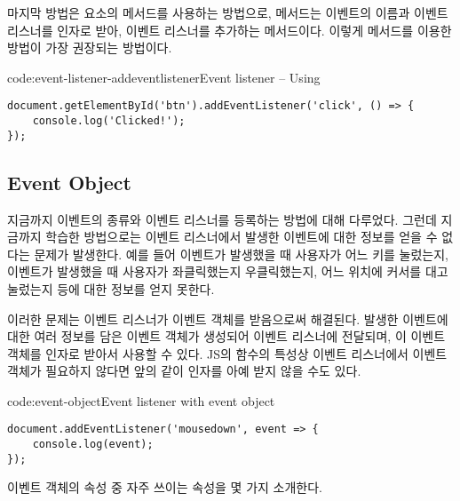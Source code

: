 마지막 방법은 요소의  메서드를 사용하는 방법으로,  메서드는 이벤트의 이름과 이벤트 리스너를 인자로 받아, 이벤트 리스너를 추가하는 메서드이다. 이렇게  메서드를 이용한 방법이 가장 권장되는 방법이다.

\begin{codeenv}{code:event-listener-addeventlistener}{Event listener – Using }\begin{verbatim}
document.getElementById('btn').addEventListener('click', () => {
    console.log('Clicked!');
});
\end{verbatim}
\end{codeenv}

\subsection*{Event Object}

지금까지 이벤트의 종류와 이벤트 리스너를 등록하는 방법에 대해 다루었다. 그런데 지금까지 학습한 방법으로는 이벤트 리스너에서 발생한 이벤트에 대한 정보를 얻을 수 없다는 문제가 발생한다. 예를 들어  이벤트가 발생했을 때 사용자가 어느 키를 눌렀는지,  이벤트가 발생했을 때 사용자가 좌클릭했는지 우클릭했는지, 어느 위치에 커서를 대고 눌렀는지 등에 대한 정보를 얻지 못한다.

이러한 문제는 이벤트 리스너가 이벤트 객체를 받음으로써 해결된다. 발생한 이벤트에 대한 여러 정보를 담은 이벤트 객체가 생성되어 이벤트 리스너에 전달되며, 이 이벤트 객체를 인자로 받아서 사용할 수 있다. JS의 함수의 특성상 이벤트 리스너에서 이벤트 객체가 필요하지 않다면 앞의 \와 같이 인자를 아예 받지 않을 수도 있다.


\begin{codeenv}{code:event-object}{Event listener with event object}\begin{verbatim}
document.addEventListener('mousedown', event => {
    console.log(event);
});
\end{verbatim}
\end{codeenv}

이벤트 객체의 속성 중 자주 쓰이는 속성을 몇 가지 소개한다.

